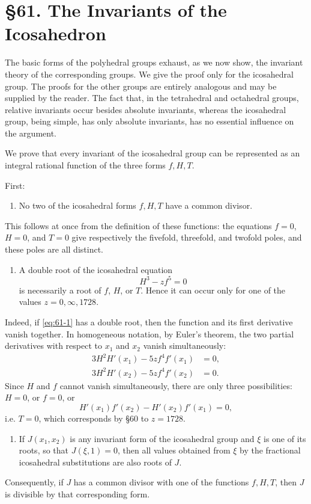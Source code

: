 \documentclass[11pt,a4paper]{book}
\newcommand{\webersection}[2]{\clearpage\section*{\S #1. #2}}
\begin{document}
\webersection{61}{The Invariants of the Icosahedron}

The basic forms of the polyhedral groups exhaust, as we now show, the invariant theory of the corresponding groups.  We give the proof only for the icosahedral group.  The proofs for the other groups are entirely analogous and may be supplied by the reader.  The fact that, in the tetrahedral and octahedral groups, relative invariants occur besides absolute invariants, whereas the icosahedral group, being simple, has only absolute invariants, has no essential influence on the argument.

We prove that every invariant of the icosahedral group can be represented as an integral rational function of the three forms \(f,H,T\).

First:

\begin{enumerate}[label=\arabic*.]
\item No two of the icosahedral forms \(f,H,T\) have a common divisor.
\end{enumerate}
This follows at once from the definition of these functions: the equations \(f=0\), \(H=0\), and \(T=0\) give respectively the fivefold, threefold, and twofold poles, and these poles are all distinct.

\begin{enumerate}[label=\arabic*.,resume]
\item A double root of the icosahedral equation
\begin{equation}\label{eq:61-1}
 H^3-zf^5=0
\end{equation}
is necessarily a root of \(f\), \(H\), or \(T\).  Hence it can occur only for one of the values \(z=0,\infty,1728\).
\end{enumerate}
Indeed, if \eqref{eq:61-1} has a double root, then the function and its first derivative vanish together.  In homogeneous notation, by Euler's theorem, the two partial derivatives with respect to \(x_1\) and \(x_2\) vanish simultaneously:
\begin{align*}
 3H^2H'(x_1)-5zf^4f'(x_1)&=0,\\
 3H^2H'(x_2)-5zf^4f'(x_2)&=0.
\end{align*}
Since \(H\) and \(f\) cannot vanish simultaneously, there are only three possibilities: \(H=0\), or \(f=0\), or
\[
 H'(x_1)f'(x_2)-H'(x_2)f'(x_1)=0,
\]
i.e. \(T=0\), which corresponds by \S 60 to \(z=1728\).

\begin{enumerate}[label=\arabic*.,resume]
\item If \(J(x_1,x_2)\) is any invariant form of the icosahedral group and \(\xi\) is one of its roots, so that \(J(\xi,1)=0\), then all values obtained from \(\xi\) by the fractional icosahedral substitutions are also roots of \(J\).
\end{enumerate}
Consequently, if \(J\) has a common divisor with one of the functions \(f,H,T\), then \(J\) is divisible by that corresponding form.
\end{document}
